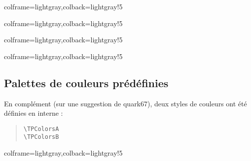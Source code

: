 \documentclass[11pt,a4paper]{ltxdoc}
\begin{document}
\begin{tcblisting}{colframe=lightgray,colback=lightgray!5}
\PlateauTrivialPursuit[Rotation=35,Unite=0.5]
\PlateauTrivialPursuit[Unite=0.5]
\end{tcblisting}

\begin{tcblisting}{colframe=lightgray,colback=lightgray!5}
\PlateauTrivialPursuit[Unite=0.5,Icones=false]
\PlateauTrivialPursuit[Unite=0.5,Couleurs=false]
\end{tcblisting}

\begin{tcblisting}{colframe=lightgray,colback=lightgray!5}
\PlateauTrivialPursuit[Unite=0.5,Vide]
\PlateauTrivialPursuit[Unite=0.5,Logo=false,Centre=false,IconeJoker=\faAward]
\end{tcblisting}

\begin{tcblisting}{colframe=lightgray,colback=lightgray!5}
\PlateauTrivialPursuit[%
	Jokers=false,%
	ListeCouleurs={%
		blue!25,red!25,teal!25,orange!25,gray!50,violet!25},%
	ListeIcones={
		\faAddressCard,\faAngleDoubleRight,\faAngry[regular],%
		\faAtom,\faBalanceScaleLeft,\faBell}
]
\end{tcblisting}

\pagebreak

\subsection{Palettes de couleurs prédéfinies}

En complément (sur une suggestion de \textsf{quark67}), deux styles de couleurs ont été définies en interne :

\begin{quote}
\begin{verbatim}
\TPColorsA
\TPColorsB
\end{verbatim}
\end{quote}

\begin{tcblisting}{colframe=lightgray,colback=lightgray!5}
\PlateauTrivialPursuit[Unite=0.5,ListeCouleurs=\TPColorsA]
\PlateauTrivialPursuit[Unite=0.5,ListeCouleurs=\TPColorsB]
\end{tcblisting}
\end{document}
